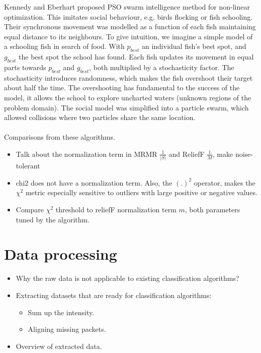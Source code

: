 \documentclass[runningheads]{llncs}
\begin{document}
Kennedy and Eberhart proposed PSO \cite{kennedy1995particle} swarm intelligence method for non-linear optimization.
This imitates social behaviour, e.g. birds flocking or fish schooling.
Their synchronous movement was modelled as a function of each fish maintaining equal distance to its neighbours. 
To give intuition, we imagine a simple model of a schooling fish in search of food. 
With $p_{best}$ an individual fish's best spot, and $g_{best}$ the best spot the school has found. 
Each fish updates its movement in equal parts towards $p_{best}$ and $g_{best}$, both multiplied by a stochasticity factor.
The stochasticity introduces randomness, which makes the fish overshoot their target about half the time. 
The overshooting has fundamental to the success of the model, it allows the school to explore uncharted waters (unknown regions of the problem domain). 
The social model was simplified into a particle swarm, which allowed collisions where two particles share the same location. 
\\\\
Comparisons from these algorithms. 
\begin{itemize}
  \item Talk about the normalization term in MRMR $\frac{1}{|S|}$ and ReliefF $\frac{1}{M}$, make noise-tolerant
  \item chi2 does not have a normalization term. Also, the $(.)^2$ operator, makes the $\chi^2$ metric especially sensitive to outliers with large positive or negative values. 
  \item Compare $\chi^2$ threshold to reliefF normalization term $m$, both parameters tuned by the algorithm. 
\end{itemize}

\section{Data processing}


\begin{itemize}
  \item Why the raw data is not applicable to existing classification algorithms?
  \item Extracting datasets that are ready for classification algorithms:
        \begin{itemize}
          \item Sum up the intensity.
          \item Aligning missing packets.
        \end{itemize}
  \item Overview of extracted data.
\end{itemize}
\end{document}
